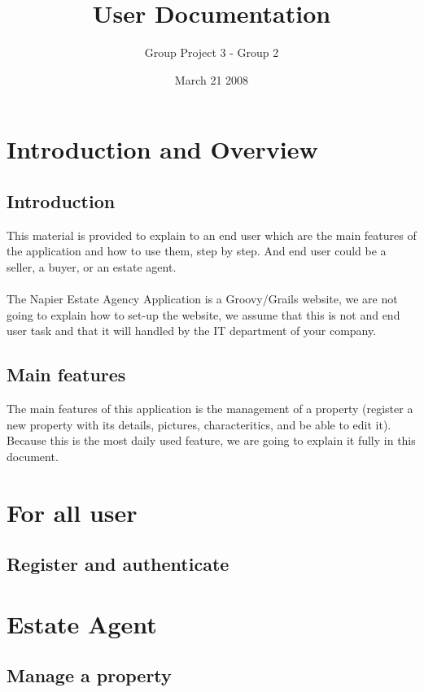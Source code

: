 \documentclass[a4paper,12pt]{article}
\title{User Documentation}
\author{Group Project 3 - Group 2}
\date{March 21 2008}
\begin{document}
\maketitle
\newpage
\tableofcontents
\newpage



\section{Introduction and Overview}
\subsection{Introduction}
This material is provided to explain to an end user which are the main features of the application and how to use them, step by step.
And end user could be a seller, a buyer, or an estate agent.

\paragraph{}
The Napier Estate Agency Application is a Groovy/Grails website, we are not going to explain how to set-up the website, 
we assume that this is not and end user task and that it will handled by the IT department of your company.

\subsection{Main features}
The main features of this application is the management of a property (register a new property with its details, pictures, characteritics, and be able to edit it).
Because this is the most daily used feature, we are going to explain it fully in this document.

\section{For all user}
\subsection{Register and authenticate}

\section{Estate Agent}
\subsection{Manage a property}
\end{document}
